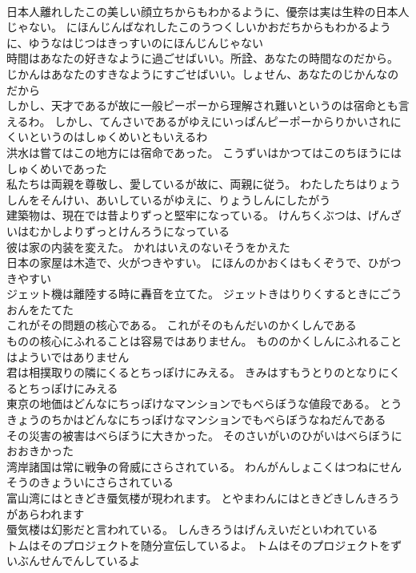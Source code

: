 \documentclass[8pt]{extreport}
\begin{document}
\begin{CJK}{UTF8}{min}
\\	日本人離れしたこの美しい顔立ちからもわかるように、優奈は実は生粋の日本人じゃない。	にほんじんばなれしたこのうつくしいかおだちからもわかるように、ゆうなはじつはきっすいのにほんじんじゃない 
\\	時間はあなたの好きなように過ごせばいい。所詮、あなたの時間なのだから。	じかんはあなたのすきなようにすごせばいい。しょせん、あなたのじかんなのだから 
\\	しかし、天才であるが故に一般ピーポーから理解され難いというのは宿命とも言えるわ。	しかし、てんさいであるがゆえにいっぱんピーポーからりかいされにくいというのはしゅくめいともいえるわ 
\\	洪水は嘗てはこの地方には宿命であった。	こうずいはかつてはこのちほうにはしゅくめいであった 
\\	私たちは両親を尊敬し、愛しているが故に、両親に従う。	わたしたちはりょうしんをそんけい、あいしているがゆえに、りょうしんにしたがう 
\\	建築物は、現在では昔よりずっと堅牢になっている。	けんちくぶつは、げんざいはむかしよりずっとけんろうになっている 
\\	彼は家の内装を変えた。	かれはいえのないそうをかえた 
\\	日本の家屋は木造で、火がつきやすい。	にほんのかおくはもくぞうで、ひがつきやすい 
\\	ジェット機は離陸する時に轟音を立てた。	ジェットきはりりくするときにごうおんをたてた 
\\	これがその問題の核心である。	これがそのもんだいのかくしんである 
\\	ものの核心にふれることは容易ではありません。	もののかくしんにふれることはよういではありません 
\\	君は相撲取りの隣にくるとちっぽけにみえる。	きみはすもうとりのとなりにくるとちっぽけにみえる 
\\	東京の地価はどんなにちっぽけなマンションでもべらぼうな値段である。	とうきょうのちかはどんなにちっぽけなマンションでもべらぼうなねだんである 
\\	その災害の被害はべらぼうに大きかった。	そのさいがいのひがいはべらぼうにおおきかった 
\\	湾岸諸国は常に戦争の脅威にさらされている。	わんがんしょこくはつねにせんそうのきょういにさらされている 
\\	富山湾にはときどき蜃気楼が現われます。	とやまわんにはときどきしんきろうがあらわれます 
\\	蜃気楼は幻影だと言われている。	しんきろうはげんえいだといわれている 
\\	トムはそのプロジェクトを随分宣伝しているよ。	トムはそのプロジェクトをずいぶんせんでんしているよ 

\end{CJK}
\end{document}
